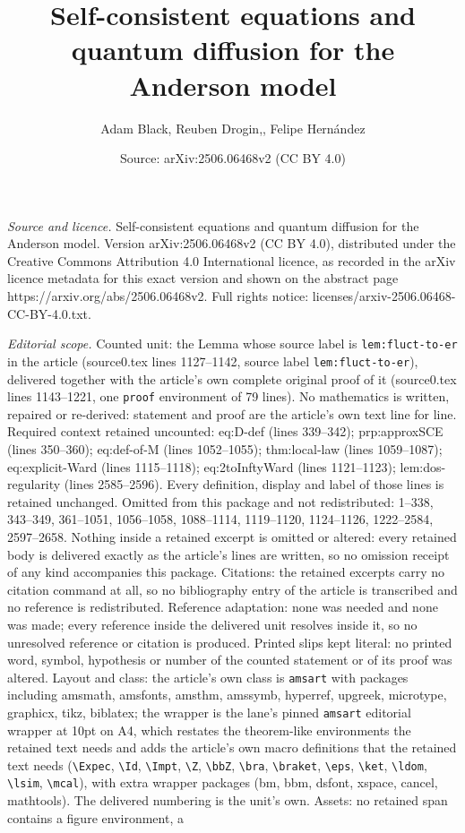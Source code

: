 \documentclass[10pt,a4paper]{amsart}
\title[Self-consistent equations and quantum diffusion for the Ande]{Self-consistent equations and quantum diffusion for the Anderson model}
\author{Adam Black, Reuben Drogin,, Felipe Hern\'andez}
\date{Source: arXiv:2506.06468v2 (CC BY 4.0)}
\begin{document}
\maketitle

\noindent\emph{Source and licence.} Self-consistent equations and quantum diffusion for the Anderson model. Version arXiv:2506.06468v2 (CC BY 4.0), distributed under the Creative Commons Attribution 4.0 International licence, as recorded in the arXiv licence metadata for this exact version and shown on the abstract page https://arxiv.org/abs/2506.06468v2. Full rights notice: licenses/arxiv-2506.06468-CC-BY-4.0.txt.\par\smallskip

\noindent\textit{Editorial scope.} Counted unit: the Lemma whose source label is \texttt{lem:fluct-to-er} in the article (source0.tex lines 1127--1142, source label \texttt{lem:fluct-to-er}), delivered together with the article's own complete original proof of it (source0.tex lines 1143--1221, one \texttt{proof} environment of 79 lines). No mathematics is written, repaired or re-derived: statement and proof are the article's own text line for line. Required context retained uncounted: eq:D-def (lines 339--342); prp:approxSCE (lines 350--360); eq:def-of-M (lines 1052--1055); thm:local-law (lines 1059--1087); eq:explicit-Ward (lines 1115--1118); eq:2toInftyWard (lines 1121--1123); lem:dos-regularity (lines 2585--2596). Every definition, display and label of those lines is retained unchanged. Omitted from this package and not redistributed: 1--338, 343--349, 361--1051, 1056--1058, 1088--1114, 1119--1120, 1124--1126, 1222--2584, 2597--2658. Nothing inside a retained excerpt is omitted or altered: every retained body is delivered exactly as the article's lines are written, so no omission receipt of any kind accompanies this package. Citations: the retained excerpts carry no citation command at all, so no bibliography entry of the article is transcribed and no reference is redistributed. Reference adaptation: none was needed and none was made; every reference inside the delivered unit resolves inside it, so no unresolved reference or citation is produced. Printed slips kept literal: no printed word, symbol, hypothesis or number of the counted statement or of its proof was altered. Layout and class: the article's own class is \texttt{amsart} with packages including amsmath, amsfonts, amsthm, amssymb, hyperref, upgreek, microtype, graphicx, tikz, biblatex; the wrapper is the lane's pinned \texttt{amsart} editorial wrapper at 10pt on A4, which restates the theorem-like environments the retained text needs and adds the article's own macro definitions that the retained text needs (\texttt{\textbackslash Expec}, \texttt{\textbackslash Id}, \texttt{\textbackslash Impt}, \texttt{\textbackslash Z}, \texttt{\textbackslash bbZ}, \texttt{\textbackslash bra}, \texttt{\textbackslash braket}, \texttt{\textbackslash eps}, \texttt{\textbackslash ket}, \texttt{\textbackslash ldom}, \texttt{\textbackslash lsim}, \texttt{\textbackslash mcal}), with extra wrapper packages (bm, bbm, dsfont, xspace, cancel, mathtools). The delivered numbering is the unit's own. Assets: no retained span contains a figure environment, a 
\end{document}

